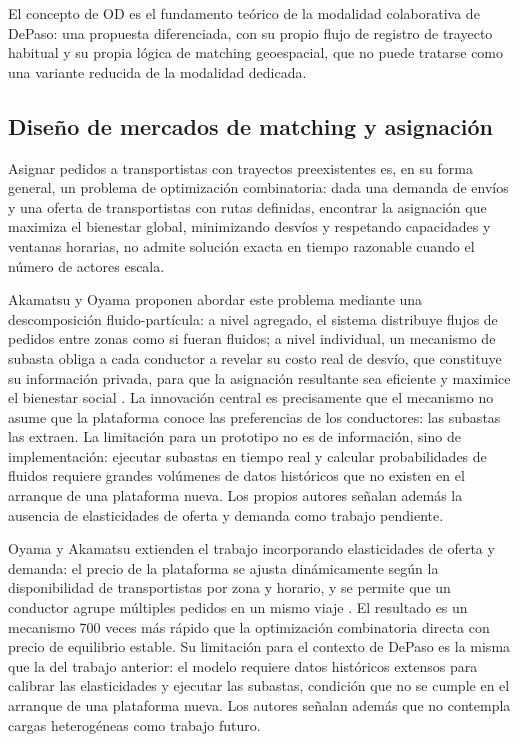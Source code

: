 El concepto de OD es el fundamento teórico de la modalidad colaborativa de DePaso: una propuesta diferenciada, con su propio flujo de registro de trayecto habitual y su propia lógica de matching geoespacial, que no puede tratarse como una variante reducida de la modalidad dedicada.

\subsection{Diseño de mercados de matching y asignación}

Asignar pedidos a transportistas con trayectos preexistentes es, en su forma general, un problema de optimización combinatoria: dada una demanda de envíos y una oferta de transportistas con rutas definidas, encontrar la asignación que maximiza el bienestar global, minimizando desvíos y respetando capacidades y ventanas horarias, no admite solución exacta en tiempo razonable cuando el número de actores escala.

Akamatsu y Oyama proponen abordar este problema mediante una descomposición fluido-partícula: a nivel agregado, el sistema distribuye flujos de pedidos entre zonas como si fueran fluidos; a nivel individual, un mecanismo de subasta obliga a cada conductor a revelar su costo real de desvío, que constituye su información privada, para que la asignación resultante sea eficiente y maximice el bienestar social \parencite{AkamatsuOyama2023}. La innovación central es precisamente que el mecanismo no asume que la plataforma conoce las preferencias de los conductores: las subastas las extraen. La limitación para un prototipo no es de información, sino de implementación: ejecutar subastas en tiempo real y calcular probabilidades de fluidos requiere grandes volúmenes de datos históricos que no existen en el arranque de una plataforma nueva. Los propios autores señalan además la ausencia de elasticidades de oferta y demanda como trabajo pendiente.

Oyama y Akamatsu extienden el trabajo incorporando elasticidades de oferta y demanda: el precio de la plataforma se ajusta dinámicamente según la disponibilidad de transportistas por zona y horario, y se permite que un conductor agrupe múltiples pedidos en un mismo viaje \parencite{OyamaAkamatsu2024}. El resultado es un mecanismo 700 veces más rápido que la optimización combinatoria directa con precio de equilibrio estable. Su limitación para el contexto de DePaso es la misma que la del trabajo anterior: el modelo requiere datos históricos extensos para calibrar las elasticidades y ejecutar las subastas, condición que no se cumple en el arranque de una plataforma nueva. Los autores señalan además que no contempla cargas heterogéneas como trabajo futuro.

